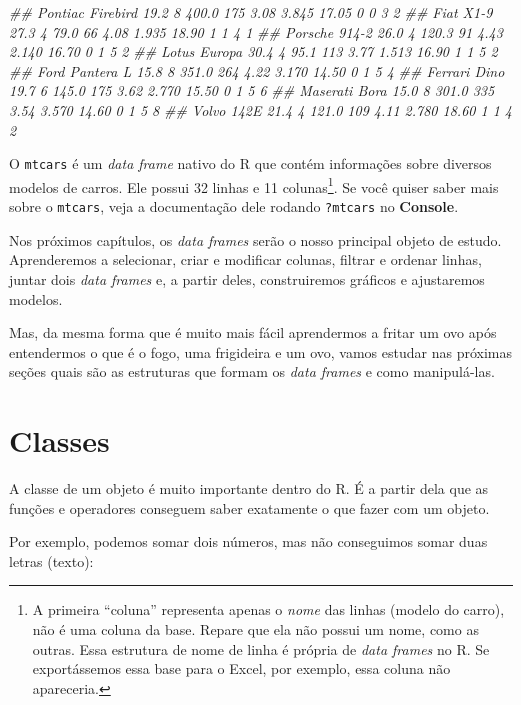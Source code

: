 \documentclass[]{book}
\newenvironment{Shaded}{\begin{snugshade}}{\end{snugshade}}
\newcommand{\CommentTok}[1]{\textcolor[rgb]{0.56,0.35,0.01}{\textit{#1}}}
\begin{document}
\begin{Shaded}
\begin{Highlighting}[]
\CommentTok{## Pontiac Firebird    19.2   8 400.0 175 3.08 3.845 17.05  0  0    3    2}
\CommentTok{## Fiat X1-9           27.3   4  79.0  66 4.08 1.935 18.90  1  1    4    1}
\CommentTok{## Porsche 914-2       26.0   4 120.3  91 4.43 2.140 16.70  0  1    5    2}
\CommentTok{## Lotus Europa        30.4   4  95.1 113 3.77 1.513 16.90  1  1    5    2}
\CommentTok{## Ford Pantera L      15.8   8 351.0 264 4.22 3.170 14.50  0  1    5    4}
\CommentTok{## Ferrari Dino        19.7   6 145.0 175 3.62 2.770 15.50  0  1    5    6}
\CommentTok{## Maserati Bora       15.0   8 301.0 335 3.54 3.570 14.60  0  1    5    8}
\CommentTok{## Volvo 142E          21.4   4 121.0 109 4.11 2.780 18.60  1  1    4    2}
\end{Highlighting}
\end{Shaded}

O \texttt{mtcars} é um \emph{data frame} nativo do R que contém informações sobre diversos modelos de carros. Ele possui 32 linhas e 11 colunas\footnote{A primeira ``coluna'' representa apenas o \emph{nome} das linhas (modelo do carro), não é uma coluna da base. Repare que ela não possui um nome, como as outras. Essa estrutura de nome de linha é própria de \emph{data frames} no R. Se exportássemos essa base para o Excel, por exemplo, essa coluna não apareceria.}. Se você quiser saber mais sobre o \texttt{mtcars}, veja a documentação dele rodando \texttt{?mtcars} no \textbf{Console}.

Nos próximos capítulos, os \emph{data frames} serão o nosso principal objeto de estudo. Aprenderemos a selecionar, criar e modificar colunas, filtrar e ordenar linhas, juntar dois \emph{data frames} e, a partir deles, construiremos gráficos e ajustaremos modelos.

Mas, da mesma forma que é muito mais fácil aprendermos a fritar um ovo após entendermos o que é o fogo, uma frigideira e um ovo, vamos estudar nas próximas seções quais são as estruturas que formam os \emph{data frames} e como manipulá-las.

\hypertarget{classes}{%
\section{Classes}\label{classes}}

A classe de um objeto é muito importante dentro do R. É a partir dela que as funções e operadores conseguem saber exatamente o que fazer com um objeto.

Por exemplo, podemos somar dois números, mas não conseguimos somar duas letras (texto):
\end{document}
